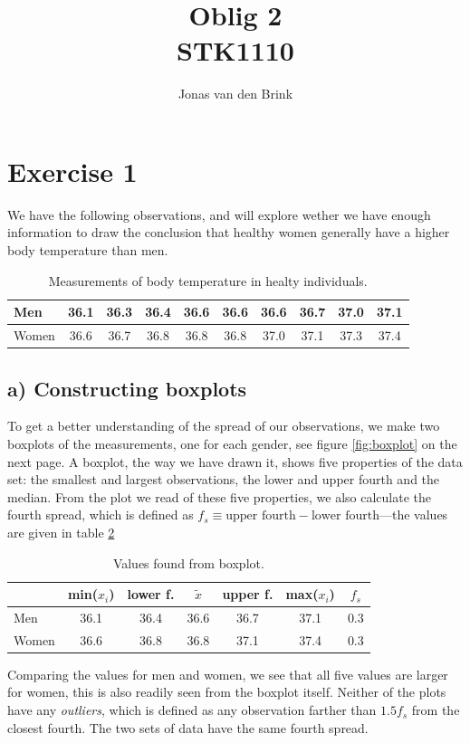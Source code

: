 \documentclass[a4paper, 11pt, titlepage]{article}
\author{Jonas van den Brink}
\title{Oblig 2 \\ STK1110}
\begin{document}
\section*{Exercise 1}
We have the following observations, and will explore wether we have enough information to draw the conclusion that healthy women generally have a higher body temperature than men.
\begin{table}[h]
\centering
\begin{tabular}{l | c | c | c | c | c | c | c | c | c }
Men & 36.1 & 36.3 & 36.4 & 36.6 & 36.6 & 36.6 & 36.7 & 37.0 & 37.1 \\ \hline
Women & 36.6 & 36.7 & 36.8 & 36.8 & 36.8 & 37.0 & 37.1 & 37.3 & 37.4 \\
\end{tabular}
\caption{Measurements of body temperature in healty individuals. \label{table:temp}}
\end{table}

\subsection*{a) Constructing boxplots}
To get a better understanding of the spread of our observations, we make two boxplots of the measurements, one for each gender, see figure \ref{fig:boxplot} on the next page. A boxplot, the way we have drawn it, shows five properties of the data set: the smallest and largest observations, the lower and upper fourth and the median. From the plot we read of these five properties, we also calculate the fourth spread, which is defined as $f_s \equiv \mbox{upper fourth} - \mbox{lower fourth}$---the values are given in table \ref{table:boxplot}

\begin{table}[h]
\centering
\begin{tabular}{l | c | c | c | c | c | c }
& min($x_i$) & lower f. & $\tilde{x}$ & upper f. & max($x_i$) & $f_s$ \\ \hline
Men & 36.1 & 36.4 & 36.6 & 36.7 & 37.1 & 0.3 \\ \hline
Women & 36.6 & 36.8 & 36.8 & 37.1 & 37.4 & 0.3 \\
\end{tabular}
\caption{Values found from boxplot. \label{table:boxplot}}
\end{table}

Comparing the values for men and women, we see that all five values are larger for women, this is also readily seen from the boxplot itself. Neither of the plots have any \emph{outliers}, which is defined as any observation farther than $1.5f_s$ from the closest fourth. The two sets of data have the same fourth spread. 
\end{document}
